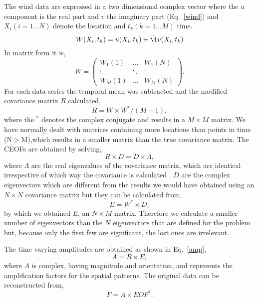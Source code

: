 The wind data are expressed in a two dimensional complex vector
where the $u$ component is the real part and $v$ the imaginary
part (Eq.~\ref{wind}) and $X_{i}(i=1\ldots N)$ denote the location
and $t_{k}(k=1\ldots M)$ time.
\begin{equation}\label{wind}
  W(X_{i},t_{k})=u(X_{i},t_{k})+\hat{\i}v(X_{i},t_{k})
\end{equation}
In matrix form it is,
\[W=\left(
\begin{array}{ccc}\label{matrix}
  W_{1}(1) & \ldots & W_{1}(N) \\
  \vdots & \ddots & \vdots \\
  W_{M}(1) & \ldots & W_{M}(N)
\end{array} \right).\]
For each data series the temporal mean was subtracted and the
modified covariance matrix $R$ calculated,
\begin{equation}\label{cov}
R=W\times W^{*}/(M-1),
\end{equation}
where the $^{*}$ denotes the complex conjugate and results in a
$M\times M$ matrix. We have normally dealt with matrices
containing more locations than points in time (N$>$M),which
results in a smaller matrix than the true covariance matrix. The
CEOFs are obtained by solving,
\begin{equation}\label{eigs}
  R\times D=D\times \Lambda,
\end{equation}
where $\Lambda$ are the real eigenvalues of the covariance matrix,
which are identical irrespective of which way the covariance is
calculated \citep{kelly88}. $D$ are the complex eigenvectors which
are different from the results we would have obtained using an
$N\times N$ covariance matrix but they can be calculated from,
\begin{equation}\label{recon}
  E=W^{*}\times D,
\end{equation}
by which we obtained $E$, an $N\times M$ matrix. Therefore we
calculate a smaller number of eigenvectors than the $N$
eigenvectors that are defined for the problem but, because only
the first few are significant, the lost ones are irrelevant.

The time varying amplitudes are obtained as shown in
Eq.~\ref{amp},
\begin{equation}\label{amp}
  A=R\times E,
\end{equation}
where $A$ is complex, having magnitude and orientation, and
represents the amplification factors for the spatial patterns. The
original data can be reconstructed from,
\begin{equation}\label{orig}
F=A\times EOF^{*}.
\end{equation}

